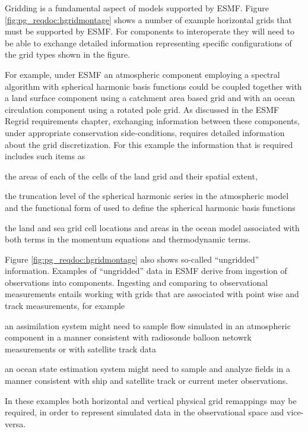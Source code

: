 Gridding is a fundamental aspect of models supported by ESMF.
Figure \ref{fig:pg_reqdoc:hgridmontage} shows a number of example 
horizontal grids that must be supported by ESMF.
For components to interoperate they will need to be able to exchange detailed 
information representing specific configurations of the grid types
shown in the figure.
 
 For example, under ESMF an atmospheric component employing a spectral
algorithm with spherical harmonic basis functions could be coupled
together with a land surface component using a catchment area based grid
and with an ocean circulation component using a rotated pole grid.
As discussed in the ESMF Regrid requirements chapter, exchanging information 
between these components, under appropriate conservation side-conditions, requires 
detailed information about the grid discretization. For this example the
information that is required includes such items as
\begin{description}
\item the areas of each of the cells of the land grid and
their spatial extent, 

\item the truncation level of the spherical harmonic
series in the atmospheric model and the functional form of
used to define the spherical harmonic basis functions

\item the land and sea grid cell locations and areas in the ocean model
associated with both terms in the momentum equations and
thermodynamic terms.
\end{description}

Figure \ref{fig:pg_reqdoc:hgridmontage} also shows so-called ``ungridded''
information. Examples of ``ungridded'' data in ESMF derive from
ingestion of observations into components.
Ingesting and comparing to observational measurements entails
working with grids that are associated with point wise 
and track measurements, for example
\begin{description}
\item an assimilation system might need to
sample flow simulated in an atmospheric component in 
a manner consistent with radiosonde balloon netowrk measurements
or with satellite track data
\item an ocean state estimation system might need to sample and analyze
fields in a manner consistent with ship and satellite
track or current meter observations.
\end{description}
In these examples both horizontal and vertical physical grid remappings
may be required, in order to represent simulated data in the observational
space and vice-versa.

